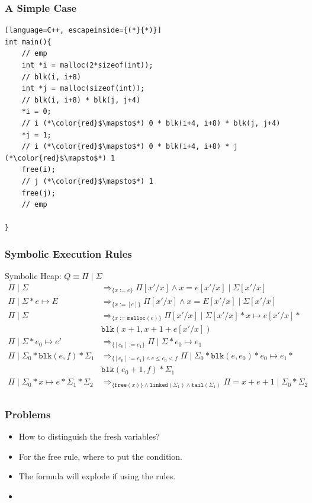 \documentclass[aspectratio=1610, 13pt]{beamer}
\begin{document}
\begin{frame}[t,fragile]\frametitle{A Simple Case}
\begin{example}
\begin{center}
\begin{lstlisting}[language=C++, escapeinside={(*}{*)}]
int main(){
    // emp 
    int *i = malloc(2*sizeof(int));
    // blk(i, i+8)
    int *j = malloc(sizeof(int));
    // blk(i, i+8) * blk(j, j+4)
    *i = 0;
    // i (*\color{red}$\mapsto$*) 0 * blk(i+4, i+8) * blk(j, j+4)
    *j = 1;
    // i (*\color{red}$\mapsto$*) 0 * blk(i+4, i+8) * j (*\color{red}$\mapsto$*) 1
    free(i);
    // j (*\color{red}$\mapsto$*) 1
    free(j);
    // emp
    
}

\end{lstlisting}
\end{center}
\end{example}


\end{frame}
\begin{frame}\frametitle{Symbolic Execution Rules}
Symbolic Heap: $Q\equiv \Pi\mid \Sigma$
\begin{align*}
\Pi\mid \Sigma&\Rightarrow_{\{x:= e\}} \Pi[x'/x]\wedge x = e[x'/x]\mid \Sigma[x'/x]\\
\Pi\mid \Sigma* e\mapsto E&\Rightarrow_{\{x:=[e]\}} \Pi[x'/x]\wedge x = E[x'/x]\mid \Sigma[x'/x]\\
\Pi\mid \Sigma&\Rightarrow_{\{x:=\mathtt{malloc}(e)\}} \Pi[x'/x]\mid \Sigma[x'/x] * x\mapsto e[x'/x] * \\
&\mathtt{blk}(x+1,x+1+e[x'/x])\\
\Pi\mid \Sigma * e_0\mapsto e'&\Rightarrow_{\{[e_0] := e_1\}} \Pi\mid \Sigma * e_0\mapsto e_1\\
\Pi\mid \Sigma_0*\mathtt{blk}(e,f)*\Sigma_1&\Rightarrow_{\{[e_0] := e_1\}\wedge e \le e_0 < f}\Pi \mid \Sigma_0*\mathtt{blk}(e,e_0)*e_0\mapsto e_1 * \\
&\mathtt{blk}(e_0+1, f)*\Sigma_1\\
\Pi\mid \Sigma_0 *x\mapsto e*\Sigma_1*\Sigma_2&\Rightarrow_{\{\mathtt{free}(x)\} \wedge \mathtt{linked}(\Sigma_1)\wedge \mathtt{tail}(\Sigma_1)} \Pi = x+e+1\mid \Sigma_0 *\Sigma_2\\
\end{align*}
\end{frame}

\begin{frame}\frametitle{Problems}
\begin{itemize}
\item How to distinguish the fresh variables?
\item For the free rule, where to put the condition.
\item The formula will explode if using the rules.
\item 
\end{itemize}
\end{frame}
\end{document}
